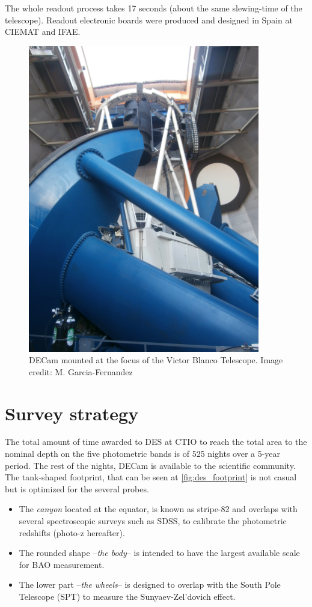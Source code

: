 The whole readout process takes 17 seconds (about the same slewing-time of the telescope). Readout electronic boards were produced and designed in Spain at CIEMAT and IFAE.
\begin{figure}
\begin{center}
\includegraphics[width=0.9\textwidth]{./Pictures/telescope_DES_mine.jpg}
\caption{DECam mounted at the focus of the Victor Blanco Telescope. Image credit: M. Garcia-Fernandez}
\label{fig:decam}
\end{center}
\end{figure}

\section{Survey strategy}
The total amount of time awarded to DES at CTIO to reach the total area to the nominal depth on the five photometric bands is of 525 nights over a 5-year period. The rest of the nights, DECam is available to the scientific community. The tank-shaped footprint, that can be seen at \autoref{fig:des_footprint} is not casual but is optimized for the several probes.
\begin{itemize}
	\item The {\it canyon} located at the equator, is known as stripe-82 and overlaps with several spectroscopic surveys such as SDSS, to calibrate the photometric redshifts (photo-z hereafter).
    \item The rounded shape --{\it the body}-- is intended to have the largest available scale for BAO measurement.
    \item The lower part --{\it the wheels}-- is designed to overlap with the South Pole Telescope (SPT) to measure the Sunyaev-Zel'dovich effect.
\end{itemize}

